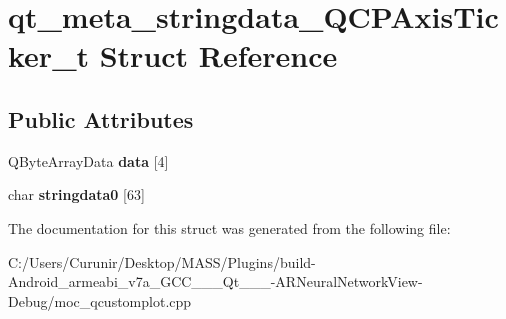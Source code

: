 \hypertarget{structqt__meta__stringdata___q_c_p_axis_ticker__t}{}\section{qt\+\_\+meta\+\_\+stringdata\+\_\+\+Q\+C\+P\+Axis\+Ticker\+\_\+t Struct Reference}
\label{structqt__meta__stringdata___q_c_p_axis_ticker__t}
\subsection*{Public Attributes}
\begin{DoxyCompactItemize}
\item 
\mbox{\label{structqt__meta__stringdata___q_c_p_axis_ticker__t_a0fc2dc33d2436602f9b16107ed0426dc}} 
Q\+Byte\+Array\+Data {\bfseries data} \mbox{[}4\mbox{]}
\item 
\mbox{\label{structqt__meta__stringdata___q_c_p_axis_ticker__t_aefa20a0e718b66a3552fd1e5f72ed2bd}} 
char {\bfseries stringdata0} \mbox{[}63\mbox{]}
\end{DoxyCompactItemize}


The documentation for this struct was generated from the following file\+:\begin{DoxyCompactItemize}
\item 
C\+:/\+Users/\+Curunir/\+Desktop/\+M\+A\+S\+S/\+Plugins/build-\/\+Android\+\_\+armeabi\+\_\+v7a\+\_\+\+G\+C\+C\+\_\+\_\+\_\+\+Qt\+\_\+\_\+\_-\/\+A\+R\+Neural\+Network\+View-\/\+Debug/moc\+\_\+qcustomplot.\+cpp\end{DoxyCompactItemize}
